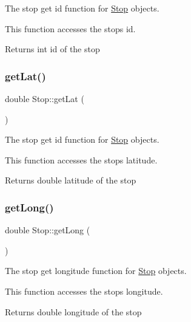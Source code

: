 The stop get id function for \hyperlink{classStop}{Stop} objects. 

This function accesses the stop\textquotesingle{}s id.

\begin{DoxyReturn}{Returns}
int id of the stop 
\end{DoxyReturn}
\mbox{\label{classStop_ad26553052a5ee0c478f4988ec51236d9}} 
\subsubsection{\texorpdfstring{get\+Lat()}{getLat()}}
{\footnotesize\ttfamily double Stop\+::get\+Lat (\begin{DoxyParamCaption}{ }\end{DoxyParamCaption})}



The stop get id function for \hyperlink{classStop}{Stop} objects. 

This function accesses the stop\textquotesingle{}s latitude.

\begin{DoxyReturn}{Returns}
double latitude of the stop 
\end{DoxyReturn}
\mbox{\label{classStop_aea4bfbf489a3a61ecb104e9aa9f613c4}} 
\subsubsection{\texorpdfstring{get\+Long()}{getLong()}}
{\footnotesize\ttfamily double Stop\+::get\+Long (\begin{DoxyParamCaption}{ }\end{DoxyParamCaption})}



The stop get longitude function for \hyperlink{classStop}{Stop} objects. 

This function accesses the stop\textquotesingle{}s longitude.

\begin{DoxyReturn}{Returns}
double longitude of the stop 
\end{DoxyReturn}
\mbox{\label{classStop_a195566d0fb9cc1bcc8929cffd5602052}} 
